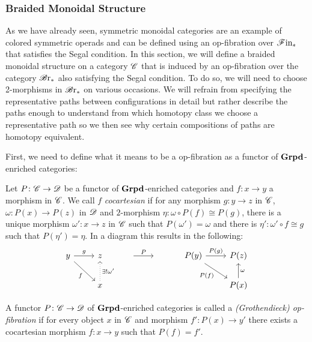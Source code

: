 \subsubsection{Braided Monoidal Structure}

As we have already seen, symmetric monoidal categories are an example of colored
symmetric operads and can be defined using an op-fibration over $\mathscr{F} \text{in}_{\ast}$ that
satisfies the Segal condition. In this section, we will define a braided
monoidal structure on a category $\mathscr{C}$ that is induced by an op-fibration over
the category $\mathscr{B} \text{r}_{\ast}$ also satisfying the Segal condition. To do so, we will need
to choose 2-morphisms in $\mathscr{B} \text{r}_{\ast}$ on various occasions. We will refrain from
specifying the representative paths between configurations in detail but rather describe the
paths enough to understand from which homotopy class we choose a representative
path so we then see why certain compositions of paths are homotopy equivalent. 



First, we need to define what it means to be
a op-fibration as a functor of $\operatorname{\textbf{Grpd}}$-enriched categories:

\begin{defin}
    Let $P \colon \mathscr{C} \to \mathscr{D} $ be a functor of $\operatorname{\textbf{Grpd}}$-enriched categories and $f
    \colon x \to y$ a morphism in $\mathscr{C}$. We call $f$ {\em cocartesian} if for
    any morphism $g \colon  y \to z$ in $\mathscr{C}$,
    $\omega \colon P(x) \to P(z)$ in $\mathscr{D}$ and $2$-morphism $\eta \colon \omega \circ P(f) \cong P(g)$,
    there is a unique morphism $\omega' \colon x \to z$ in $\mathscr{C}$ such that
    $P(\omega')=\omega$ and there is $\eta' \colon \omega' \circ f \cong g$ such that $P(\eta')=\eta$. In a diagram this results
    in the following:
    \[
        \begin{tikzcd}
            y \arrow[r, "g"] \arrow[rd, "f"'] & z                                & {} \arrow[r, "P"] & {} & P(y) \arrow[r, "P(g)"] \arrow[rd, "P(f)"'] & P(z)           \\
                                            & x \arrow[u, "\exists! \omega'"', dotted] &                   &    &                           & P(x) \arrow[u, "\omega"']
        \end{tikzcd}
    \]
\end{defin}

\begin{defin}
    A functor $P \colon \mathscr{C} \to \mathscr{D}$ of $\operatorname{\textbf{Grpd}}$-enriched categories is called 
    a {\em (Grothendieck) op-fibration} if for every object $x$ in $\mathscr{C}$ and morphism
    $f' \colon P(x) \to y'$ there exists a cocartesian morphism $f \colon x
    \to y$ such that $P(f)=f'$.
\end{defin}

